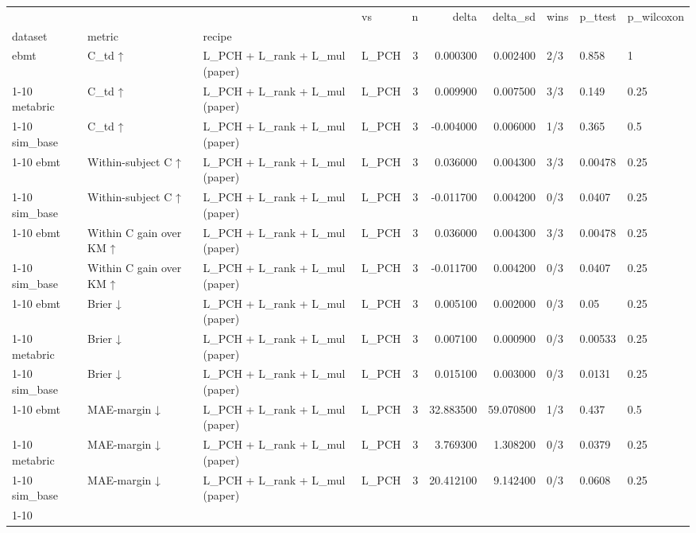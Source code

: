 \begin{tabular}{llllrrrlll}
\toprule
 &  &  & vs & n & delta & delta\_sd & wins & p\_ttest & p\_wilcoxon \\
dataset & metric & recipe &  &  &  &  &  &  &  \\
\midrule
ebmt & C\_td ↑ & L\_PCH + L\_rank + L\_mul (paper) & L\_PCH & 3 & 0.000300 & 0.002400 & 2/3 & 0.858 & 1 \\
\cline{1-10} \cline{2-10}
metabric & C\_td ↑ & L\_PCH + L\_rank + L\_mul (paper) & L\_PCH & 3 & 0.009900 & 0.007500 & 3/3 & 0.149 & 0.25 \\
\cline{1-10} \cline{2-10}
sim\_base & C\_td ↑ & L\_PCH + L\_rank + L\_mul (paper) & L\_PCH & 3 & -0.004000 & 0.006000 & 1/3 & 0.365 & 0.5 \\
\cline{1-10} \cline{2-10}
ebmt & Within-subject C ↑ & L\_PCH + L\_rank + L\_mul (paper) & L\_PCH & 3 & 0.036000 & 0.004300 & 3/3 & 0.00478 & 0.25 \\
\cline{1-10} \cline{2-10}
sim\_base & Within-subject C ↑ & L\_PCH + L\_rank + L\_mul (paper) & L\_PCH & 3 & -0.011700 & 0.004200 & 0/3 & 0.0407 & 0.25 \\
\cline{1-10} \cline{2-10}
ebmt & Within C gain over KM ↑ & L\_PCH + L\_rank + L\_mul (paper) & L\_PCH & 3 & 0.036000 & 0.004300 & 3/3 & 0.00478 & 0.25 \\
\cline{1-10} \cline{2-10}
sim\_base & Within C gain over KM ↑ & L\_PCH + L\_rank + L\_mul (paper) & L\_PCH & 3 & -0.011700 & 0.004200 & 0/3 & 0.0407 & 0.25 \\
\cline{1-10} \cline{2-10}
ebmt & Brier ↓ & L\_PCH + L\_rank + L\_mul (paper) & L\_PCH & 3 & 0.005100 & 0.002000 & 0/3 & 0.05 & 0.25 \\
\cline{1-10} \cline{2-10}
metabric & Brier ↓ & L\_PCH + L\_rank + L\_mul (paper) & L\_PCH & 3 & 0.007100 & 0.000900 & 0/3 & 0.00533 & 0.25 \\
\cline{1-10} \cline{2-10}
sim\_base & Brier ↓ & L\_PCH + L\_rank + L\_mul (paper) & L\_PCH & 3 & 0.015100 & 0.003000 & 0/3 & 0.0131 & 0.25 \\
\cline{1-10} \cline{2-10}
ebmt & MAE-margin ↓ & L\_PCH + L\_rank + L\_mul (paper) & L\_PCH & 3 & 32.883500 & 59.070800 & 1/3 & 0.437 & 0.5 \\
\cline{1-10} \cline{2-10}
metabric & MAE-margin ↓ & L\_PCH + L\_rank + L\_mul (paper) & L\_PCH & 3 & 3.769300 & 1.308200 & 0/3 & 0.0379 & 0.25 \\
\cline{1-10} \cline{2-10}
sim\_base & MAE-margin ↓ & L\_PCH + L\_rank + L\_mul (paper) & L\_PCH & 3 & 20.412100 & 9.142400 & 0/3 & 0.0608 & 0.25 \\
\cline{1-10} \cline{2-10}
\bottomrule
\end{tabular}
